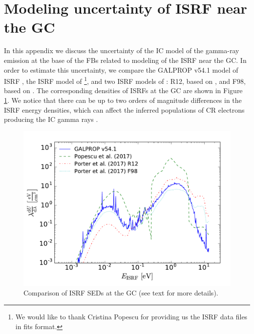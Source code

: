 \section{Modeling uncertainty of ISRF near the GC} 

In this appendix we discuss the uncertainty of the IC model of the gamma-ray emission at the base of the FBs 
related to modeling of the ISRF near the GC.
In order to estimate this uncertainty, we compare the GALPROP v54.1 model of ISRF
\citep{2006ApJ...640L.155M,  2006ApJ...648L..29P},
the ISRF model of \cite{2017MNRAS.470.2539P}%
\footnote{We would like to thank Cristina Popescu for providing us the ISRF data files in fits format.},
and two ISRF models of \cite{2017ApJ...846...67P}: 
R12, based on \cite{2012A&A...545A..39R},
and F98, based on \cite{1998ApJ...492..495F}.
The corresponding densities of ISRFs at the GC are shown in Figure \ref{fig:isrfs}.
We notice that there can be up to two orders of magnitude differences in the ISRF energy densities,
which can affect the inferred populations of CR electrons producing the IC gamma rays 
\citep[see also][]{2017ApJ...846...67P, 2019APh...107....1N}.

\begin{figure}[h]
\centering
\includegraphics[width=\twopic\textwidth]{plots/ISRF_comparison}
\caption{Comparison of ISRF SEDs at the GC (see text for more details).}
\label{fig:isrfs}
\end{figure}

